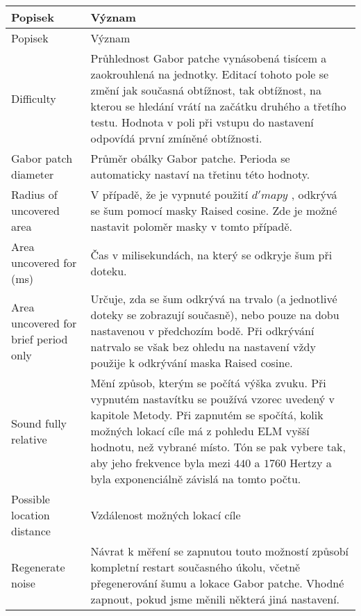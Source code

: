{
\renewcommand{\arraystretch}{2}
\begin{longtable}{p{}p{}}
\hline
\hline
\rowcolor{white}
Popisek & Význam \\
\hline
\endfirsthead
\hline
\hline
\rowcolor{white}
Popisek & Význam \\
\hline
\endhead
\hline
\endfoot
\hline
\hline
\endlastfoot

Difficulty & Průhlednost Gabor patche vynásobená tisícem a zaokrouhlená na
jednotky. Editací tohoto pole se změní jak současná obtížnost, tak obtížnost,
na kterou se hledání vrátí na začátku druhého a třetího testu. Hodnota v poli
při vstupu do nastavení odpovídá první zmíněné obtížnosti.\\

Gabor patch diameter & Průměr obálky Gabor patche. Perioda se automaticky
nastaví na třetinu této hodnoty. \index{Gabor patch}\\

Radius of uncovered area & V případě, že je vypnuté použití $d' mapy$ \index{d'
mapa@$d'$ mapa}, odkrývá se šum pomocí masky Raised cosine. Zde je možné
nastavit poloměr masky v tomto případě.\\ 

Area uncovered for (ms) & Čas v milisekundách, na který se odkryje šum při
doteku.\\

Area uncovered for brief period only & Určuje, zda se šum odkrývá na trvalo (a
jednotlivé doteky se zobrazují současně), nebo pouze na dobu nastavenou v
předchozím bodě. Při odkrývání natrvalo se však bez ohledu na nastavení vždy
použije k odkrývání maska Raised cosine.\\

Sound fully relative & Mění způsob, kterým se počítá výška zvuku. Při vypnutém
nastavítku se používá vzorec uvedený v kapitole Metody. Při zapnutém se
spočítá, kolik možných lokací cíle má z pohledu ELM vyšší hodnotu, než vybrané
místo. Tón se pak vybere tak, aby jeho frekvence byla mezi $440$ a $1760$
Hertzy a byla exponenciálně závislá na tomto počtu. \\

Possible location distance & Vzdálenost možných lokací cíle \\

Regenerate noise & Návrat k měření se zapnutou touto možností způsobí kompletní
restart současného úkolu, včetně přegenerování šumu a lokace Gabor patche.
Vhodné zapnout, pokud jsme měnili některá jiná nastavení. \\


\end{longtable}}
